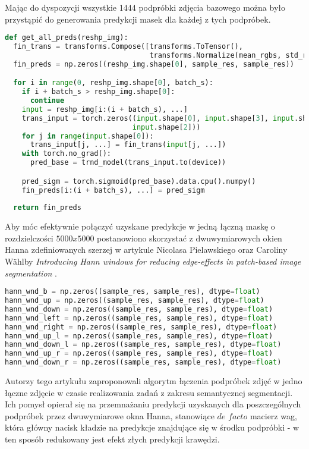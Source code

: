 \cell
Mając do dyspozycji wszystkie 1444 podpróbki zdjęcia bazowego można było przystąpić do generowania predykcji masek dla każdej z tych podpróbek.
\vspace{1.5cm}

\cell
\begin{lstlisting}[name=Rozdzial3.1, language=Python]
def get_all_preds(reshp_img):
  fin_trans = transforms.Compose([transforms.ToTensor(), 
                                  transforms.Normalize(mean_rgbs, std_rgbs)])
  fin_preds = np.zeros((reshp_img.shape[0], sample_res, sample_res))

  for i in range(0, reshp_img.shape[0], batch_s):
    if i + batch_s > reshp_img.shape[0]:
      continue
    input = reshp_img[i:(i + batch_s), ...]
    trans_input = torch.zeros((input.shape[0], input.shape[3], input.shape[1], 
                              input.shape[2]))
    for j in range(input.shape[0]):
      trans_input[j, ...] = fin_trans(input[j, ...])
    with torch.no_grad():
      pred_base = trnd_model(trans_input.to(device))

    pred_sigm = torch.sigmoid(pred_base).data.cpu().numpy()
    fin_preds[i:(i + batch_s), ...] = pred_sigm
    
  return fin_preds
\end{lstlisting}


\cell
Aby móc efektywnie połączyć uzyskane predykcje w jedną łączną maskę o rozdzielczości $\textit{5000x5000}$ postanowiono skorzystać z dwuwymiarowych okien Hanna zdefiniowanych szerzej w artykule Nicolasa Pielawskiego oraz Caroliny Wählby \textit{Introducing Hann windows for reducing edge-effects in patch-based image segmentation} \cite{pielawski}.

\cell
\begin{lstlisting}[name=Rozdzial3.1, language=Python]
hann_wnd_b = np.zeros((sample_res, sample_res), dtype=float)
hann_wnd_up = np.zeros((sample_res, sample_res), dtype=float)
hann_wnd_down = np.zeros((sample_res, sample_res), dtype=float)
hann_wnd_left = np.zeros((sample_res, sample_res), dtype=float)
hann_wnd_right = np.zeros((sample_res, sample_res), dtype=float)
hann_wnd_up_l = np.zeros((sample_res, sample_res), dtype=float)
hann_wnd_down_l = np.zeros((sample_res, sample_res), dtype=float)
hann_wnd_up_r = np.zeros((sample_res, sample_res), dtype=float)
hann_wnd_down_r = np.zeros((sample_res, sample_res), dtype=float)
\end{lstlisting}


\cell
Autorzy tego artykułu zaproponowali algorytm łączenia podpróbek zdjęć w jedno łączne zdjęcie w czasie realizowania zadań z zakresu semantycznej segmentacji. Ich pomysł opierał się na przemnażaniu predykcji uzyskanych dla poszczególnych podpróbek przez dwuwymiarowe okna Hanna, stanowiące $\textit{de facto}$ macierz wag, która główny nacisk kładzie na predykcje znajdujące się w środku podpróbki - w ten sposób redukowany jest efekt złych predykcji krawędzi.

